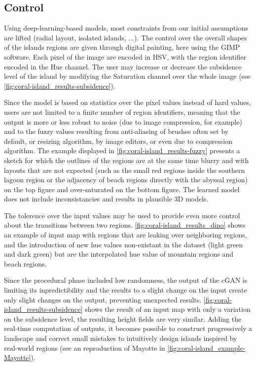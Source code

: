 \subsection{Control}
\label{sec:coral-island_control}

Using deep-learning-based models, most constraints from our initial assumptions are lifted (radial layout, isolated islands, ...). The control over the overall shapes of the islands regions are given through digital painting, here using the GIMP software. Each pixel of the image are encoded in HSV, with the region identifier encoded in the Hue channel. The user may increase or decrease the subsidence level of the island by modifying the Saturation channel over the whole image (see \cref{fig:coral-island_results-subsidence}).

Since the model is based on statistics over the pixel values instead of hard values, users are not limited to a finite number of region identifiers, meaning that the output is more or less robust to noise (due to image compression, for example) and to the fuzzy values resulting from anti-aliasing of brushes often set by default, or resizing algorithm, by image editors, or even due to compression algorithm. The example displayed in \cref{fig:coral-island_results-fuzzy} presents a sketch for which the outlines of the regions are at the same time blurry and with layouts that are not expected (such as the small red regions inside the southern lagoon region or the adjacency of beach regions directly with the abyssal region) on the top figure and over-saturated on the bottom figure. The learned model does not include inconsistancies and results in plausible 3D models.

The tolerence over the input values may be used to provide even more control about the transitions between two regions. \cref{fig:coral-island_results_dino} shows an example of input map with regions that are leaking over neighboring regions, and the introduction of new hue values non-existant in the dataset (light green and dark green) but are the interpolated hue value of mountain regions and beach regions.

Since the procedural phase included low randomness, the output of the cGAN is limiting its inpredictibility and the results to a slight change on the input create only slight changes on the output, preventing unexpected results. \cref{fig:coral-island_results-subsidence} shows the result of an input map with only a variation on the subsidence level, the resulting height fields are very similar. Adding the real-time computation of outputs, it becomes possible to construct progressively a landscape and correct small mistakes to intuitively design islands inspired by real-world regions (see an reproduction of Mayotte in \cref{fig:coral-island_example-Mayotte}). 

